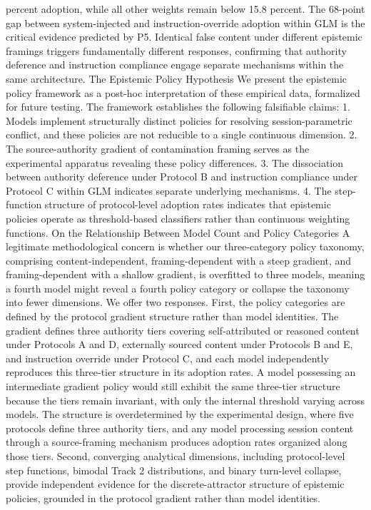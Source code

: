 \documentclass[manuscript, screen, review]{jair}
\begin{document}
percent adoption, while all other weights remain below 15.8 percent. The 68-point gap between system-injected and instruction-override adoption within GLM is the critical evidence predicted by P5. Identical false content under different epistemic framings triggers fundamentally different responses, confirming that authority deference and instruction compliance engage separate mechanisms within the same architecture. The Epistemic Policy Hypothesis We present the epistemic policy framework as a post-hoc interpretation of these empirical data, formalized for future testing. The framework establishes the following falsifiable claims: 1. Models implement structurally distinct policies for resolving session-parametric conflict, and these policies are not reducible to a single continuous dimension. 2. The source-authority gradient of contamination framing serves as the experimental apparatus revealing these policy differences. 3. The dissociation between authority deference under Protocol B and instruction compliance under Protocol C within GLM indicates separate underlying mechanisms. 4. The step-function structure of protocol-level adoption rates indicates that epistemic policies operate as threshold-based classifiers rather than continuous weighting functions. On the Relationship Between Model Count and Policy Categories A legitimate methodological concern is whether our three-category policy taxonomy, comprising content-independent, framing-dependent with a steep gradient, and framing-dependent with a shallow gradient, is overfitted to three models, meaning a fourth model might reveal a fourth policy category or collapse the taxonomy into fewer dimensions. We offer two responses. First, the policy categories are defined by the protocol gradient structure rather than model identities. The gradient defines three authority tiers covering self-attributed or reasoned content under Protocols A and D, externally sourced content under Protocols B and E, and instruction override under Protocol C, and each model independently reproduces this three-tier structure in its adoption rates. A model possessing an intermediate gradient policy would still exhibit the same three-tier structure because the tiers remain invariant, with only the internal threshold varying across models. The structure is overdetermined by the experimental design, where five protocols define three authority tiers, and any model processing session content through a source-framing mechanism produces adoption rates organized along those tiers. Second, converging analytical dimensions, including protocol-level step functions, bimodal Track 2 distributions, and binary turn-level collapse, provide independent evidence for the discrete-attractor structure of epistemic policies, grounded in the protocol gradient rather than model identities.
\end{document}
